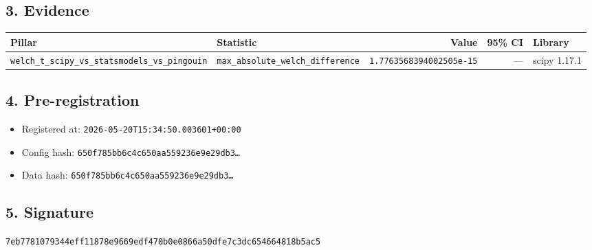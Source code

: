 \documentclass{article}
\begin{document}
\subsection*{3. Evidence}
\begin{tabular}{llrrl}\toprule
\textbf{Pillar} & \textbf{Statistic} & \textbf{Value} & \textbf{95\% CI} & \textbf{Library} \\\midrule
\texttt{welch\_t\_scipy\_vs\_statsmodels\_vs\_pingouin} & \texttt{max\_absolute\_welch\_difference} & \texttt{1.7763568394002505e-15} & --- & scipy 1.17.1 \\
\bottomrule\end{tabular}
\subsection*{4. Pre-registration}
\begin{itemize}
\item Registered at: \texttt{2026-05-20T15:34:50.003601+00:00}
\item Config hash: \texttt{650f785bb6c4c650aa559236e9e29db3\dots}
\item Data hash: \texttt{650f785bb6c4c650aa559236e9e29db3\dots}
\end{itemize}
\subsection*{5. Signature}
\texttt{7eb7781079344eff11878e9669edf470b0e0866a50dfe7c3dc654664818b5ac5}\\
\end{document}
